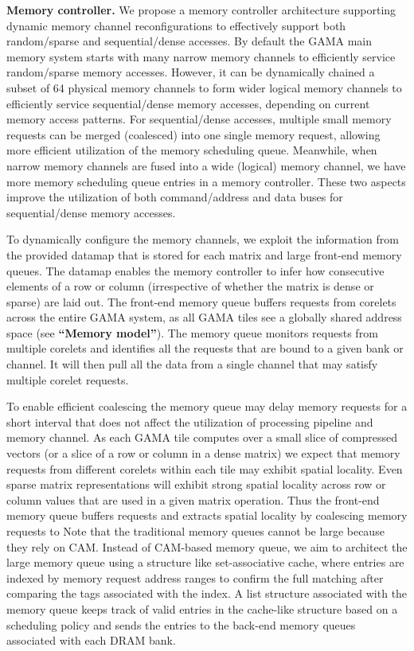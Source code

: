 \vspace{3pt}
\noindent
\textbf{Memory controller.} 
We propose a memory controller architecture supporting dynamic memory channel reconfigurations to effectively support both random/sparse and sequential/dense accesses.
By default the GAMA main memory system starts with many narrow memory channels to efficiently service random/sparse memory accesses.
However, it can be dynamically chained a subset of 64 physical memory channels to form wider logical memory channels to efficiently service sequential/dense memory accesses, depending on current memory access patterns. 
For sequential/dense accesses, multiple small memory requests can be merged (coalesced) into one single memory request, allowing more efficient utilization of the memory scheduling queue.
Meanwhile, when narrow memory channels are fused into a wide (logical) memory channel, we have more memory scheduling queue entries in a memory controller.
These two aspects improve the utilization of both command/address and data buses for sequential/dense memory accesses.


To dynamically configure the memory channels, we exploit the information from the provided datamap that is stored for each matrix and large front-end memory queues. 
The datamap enables the memory controller to infer how consecutive elements of a row or column (irrespective of whether the matrix is dense or sparse) are laid out. 
The front-end memory queue buffers requests from corelets across the entire GAMA system, as all GAMA tiles see a globally shared address space (see \textbf{``Memory model''}). 
The memory queue monitors requests from multiple corelets and identifies all the requests that are bound to a given bank or channel. 
It will then pull all the data from a single channel that may satisfy multiple corelet requests.  

To enable efficient coalescing the memory queue may delay memory requests for a short interval that does not affect the utilization of processing pipeline and memory channel. 
As each GAMA tile computes over a small slice of compressed vectors (or a slice of a row or column in a dense matrix) we expect that memory requests from different corelets within each tile may exhibit spatial locality. 
Even sparse matrix representations will exhibit strong spatial locality across row or column values that are used in a given matrix operation.  Thus the front-end memory queue buffers requests and extracts spatial locality by coalescing memory requests to  
Note that the traditional memory queues cannot be large because they rely on CAM.
Instead of CAM-based memory queue, we aim to architect the large memory queue using a structure like set-associative cache, where entries are indexed by memory request address ranges to confirm the full matching after comparing the tags associated with the index.
A list structure associated with the memory queue keeps track of valid entries in the cache-like structure based on a scheduling policy and sends the entries to the back-end memory queues associated with each DRAM bank.

